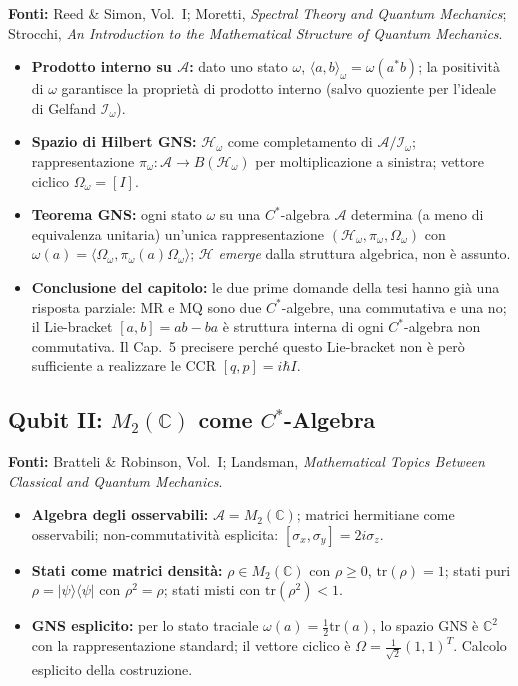 \documentclass[12pt, a4paper]{article}
\newcommand{\fonti}[1]{%
	\begin{fontebox}
		\textcolor{fontecolor}{\footnotesize\textbf{Fonti:} #1}
	\end{fontebox}%
}
\begin{document}
	\fonti{Reed \& Simon, Vol.~I; Moretti, \textit{Spectral Theory and Quantum Mechanics};
		Strocchi, \textit{An Introduction to the Mathematical Structure of Quantum Mechanics}.}
	
	\begin{itemize}
		\item \textbf{Prodotto interno su $\mathcal{A}$:} dato uno stato $\omega$,
		$\langle a, b\rangle_\omega = \omega(a^*b)$; la positività di $\omega$ garantisce
		la proprietà di prodotto interno (salvo quoziente per l'ideale di Gelfand
		$\mathcal{I}_\omega$).
		\item \textbf{Spazio di Hilbert GNS:} $\mathcal{H}_\omega$ come completamento di
		$\mathcal{A}/\mathcal{I}_\omega$; rappresentazione $\pi_\omega: \mathcal{A} \to
		B(\mathcal{H}_\omega)$ per moltiplicazione a sinistra; vettore ciclico $\Omega_\omega
		= [I]$.
		\item \textbf{Teorema GNS:} ogni stato $\omega$ su una $C^*$-algebra $\mathcal{A}$
		determina (a meno di equivalenza unitaria) un'unica rappresentazione
		$(\mathcal{H}_\omega, \pi_\omega, \Omega_\omega)$ con
		$\omega(a) = \langle\Omega_\omega, \pi_\omega(a)\Omega_\omega\rangle$;
		$\mathcal{H}$ \emph{emerge} dalla struttura algebrica, non è assunto.
		\item \textbf{Conclusione del capitolo:} le due prime domande della tesi hanno
		già una risposta parziale: MR e MQ sono due $C^*$-algebre, una commutativa e
		una no; il Lie-bracket $[a,b] = ab - ba$ è struttura interna di ogni
		$C^*$-algebra non commutativa. Il Cap.\ 5 precisere perché questo Lie-bracket
		non è però sufficiente a realizzare le CCR $[q,p] = i\hbar I$.
	\end{itemize}
	
	\subsection{Qubit II: $M_2(\mathbb{C})$ come $C^*$-Algebra}
	
	\fonti{Bratteli \& Robinson, Vol.~I; Landsman, \textit{Mathematical Topics Between
			Classical and Quantum Mechanics}.}
	
	\begin{itemize}
		\item \textbf{Algebra degli osservabili:} $\mathcal{A} = M_2(\mathbb{C})$; matrici
		hermitiane come osservabili; non-commutatività esplicita:
		$[\sigma_x, \sigma_y] = 2i\sigma_z$.
		\item \textbf{Stati come matrici densità:} $\rho \in M_2(\mathbb{C})$ con
		$\rho \geq 0$, $\mathrm{tr}(\rho) = 1$; stati puri $\rho = |\psi\rangle\langle\psi|$
		con $\rho^2 = \rho$; stati misti con $\mathrm{tr}(\rho^2) < 1$.
		\item \textbf{GNS esplicito:} per lo stato traciale $\omega(a) = \frac{1}{2}\mathrm{tr}(a)$,
		lo spazio GNS è $\mathbb{C}^2$ con la rappresentazione standard; il vettore
		ciclico è $\Omega = \frac{1}{\sqrt{2}}(1, 1)^T$. Calcolo esplicito della
		costruzione.
	\end{itemize}
	
\end{document}
